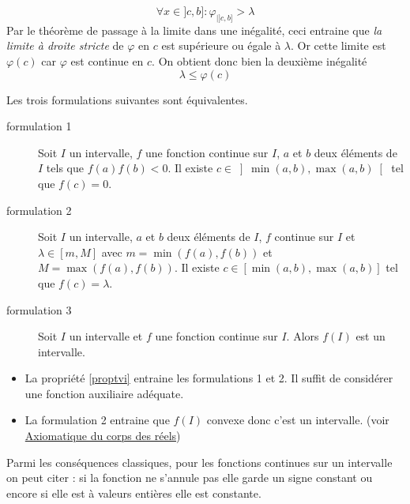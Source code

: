 \begin{demo}
\begin{displaymath}
 \forall x \in ]c,b] : \varphi_{|]c,b]}>\lambda
\end{displaymath}
Par le théorème de passage à la limite dans une inégalité, ceci entraine que \emph{la limite à droite stricte} de $\varphi$ en $c$ est supérieure ou égale à $\lambda$. Or cette limite est $\varphi(c)$ car $\varphi$ est continue en $c$. On obtient donc bien la deuxième inégalité
\begin{displaymath}
 \lambda \leq \varphi(c)
\end{displaymath}
\end{demo}

\begin{thm}
Les trois formulations suivantes sont équivalentes.
 \begin{description}
  \item[formulation 1] Soit $I$ un intervalle, $f$ une fonction continue sur $I$, $a$ et $b$ deux éléments de $I$ tels que $f(a)f(b)<0$. Il existe $c\in \left] \min(a,b), \max(a,b)\right[$ tel que $f(c)=0$.
  \item[formulation 2] Soit $I$ un intervalle, $a$ et $b$ deux éléments de $I$, $f$ continue sur $I$ et $\lambda \in \left[ m, M\right] $ avec $m = \min(f(a),f(b))$ et $M = \max(f(a),f(b))$. Il existe $c\in \left[ \min(a,b),\max(a,b)\right] $ tel que $f(c)=\lambda$.
  \item[formulation 3] Soit $I$ un intervalle et $f$ une fonction continue sur $I$. Alors $f(I)$ est un intervalle.
 \end{description}
\end{thm}
\begin{demo}
 \begin{itemize}
  \item La propriété \ref{proptvi} entraine les formulations 1 et 2. Il suffit de considérer une fonction auxiliaire adéquate.
  \item La formulation 2 entraine que $f(I)$ convexe donc c'est un intervalle. (voir \href{\baseurl C2192.pdf}{Axiomatique du corps des réels})
 \end{itemize}
\end{demo}
\begin{rem}
 Parmi les conséquences classiques, pour les fonctions continues sur un intervalle on peut citer : si la fonction ne s'annule pas elle garde un signe constant ou encore si elle est à valeurs entières elle est constante.
\end{rem}

